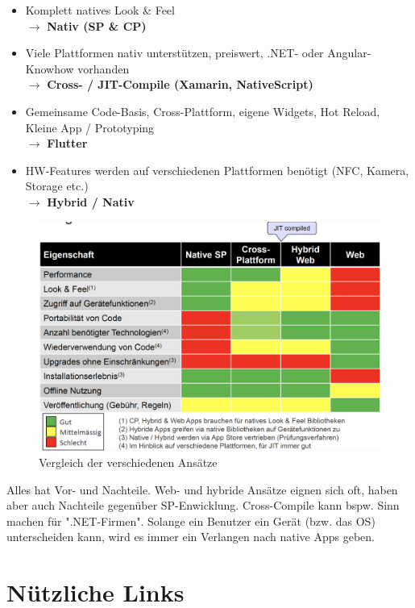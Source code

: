 \documentclass[a4paper]{article}
\begin{document}
{\begin{itemize}
		\item Komplett natives Look \& Feel \\
		$\rightarrow$ \textbf{Nativ (SP \& CP)}
		
		\item Viele Plattformen nativ unterstützen, preiswert, .NET- oder Angular-Knowhow vorhanden \\
		$\rightarrow$ \textbf{Cross- / JIT-Compile (Xamarin, NativeScript)}
		
		\item Gemeinsame Code-Basis, Cross-Plattform, eigene Widgets, Hot Reload, Kleine App / Prototyping \\
		$\rightarrow$ \textbf{Flutter}
		
		\item HW-Features werden auf verschiedenen Plattformen benötigt (NFC, Kamera, Storage etc.) \\
		$\rightarrow$ \textbf{Hybrid / Nativ}
		
	\end{itemize}
	
	\begin{figure}[!htb]
		\centering
		\includegraphics[width=.8\textwidth]{img/android8/ansatze_vergleich.png}
		\caption{Vergleich der verschiedenen Ansätze}
		\label{fig:ansatze_vergleich}
	\end{figure}
	\noindent
	Alles hat Vor- und Nachteile.
	Web- und hybride Ansätze eignen sich oft, haben aber auch Nachteile gegenüber SP-Enwicklung.
	Cross-Compile kann bspw. Sinn machen für ".NET-Firmen".
	Solange ein Benutzer ein Gerät (bzw. das OS) unterscheiden kann, wird es immer ein Verlangen nach native Apps geben. 
	
	\newpage
	

	
	
\newpage
	
\section{Nützliche Links}

}
\end{document}
